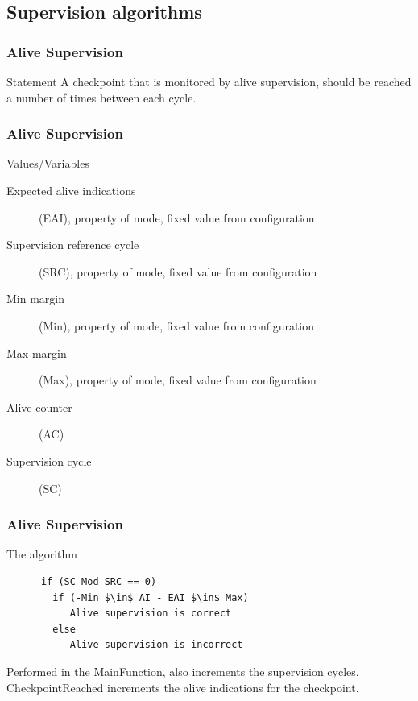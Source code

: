 \documentclass{beamer}
\begin{document}
\subsection{Supervision algorithms}
\begin{frame}
  \frametitle{Alive Supervision}
  \begin{block}{Statement}
    A checkpoint that is monitored by alive supervision, should be
    reached a number of times between each cycle.
  \end{block}
\end{frame}

\begin{frame}
  \frametitle{Alive Supervision}
  \begin{block}{Values/Variables}
    \begin{description}
      \item[Expected alive indications] (EAI), property of mode, fixed
        value from configuration
      \item[Supervision reference cycle] (SRC), property of mode, fixed value
        from configuration
      \item[Min margin] (Min), property of mode, fixed value from configuration
      \item[Max margin] (Max), property of mode, fixed value from configuration
      \item[Alive counter] (AC)
      \item[Supervision cycle] (SC)
    \end{description}
  \end{block}
\end{frame}

\begin{frame}[fragile]
  \frametitle{Alive Supervision}
  \begin{block}{The algorithm}
    \begin{lstlisting}
      if (SC Mod SRC == 0)
        if (-Min $\in$ AI - EAI $\in$ Max)
           Alive supervision is correct
        else
           Alive supervision is incorrect
    \end{lstlisting}
  \end{block}
  Performed in the MainFunction, also increments the supervision
  cycles.\\
  CheckpointReached increments the alive indications for the
  checkpoint.
\end{frame}
\end{document}
